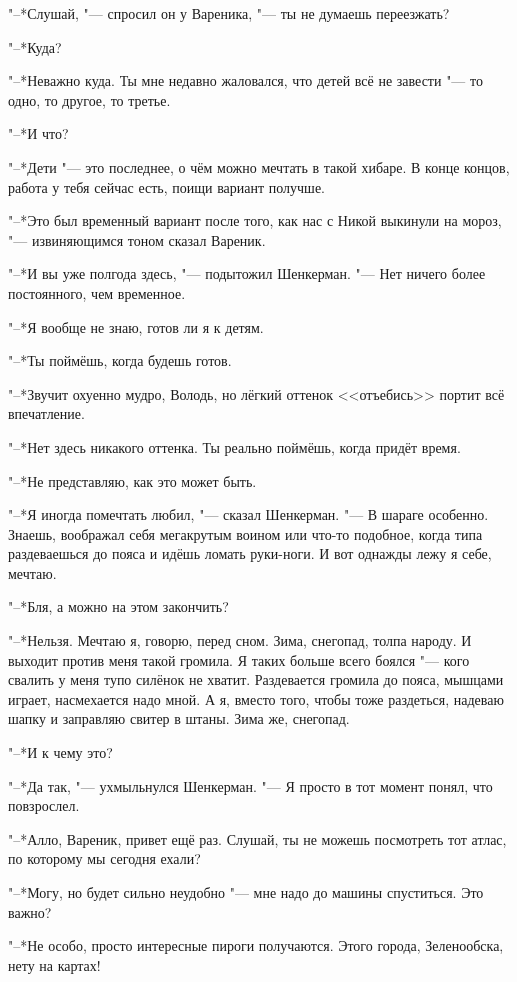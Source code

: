"--*Слушай, "--- спросил он у Вареника, "--- ты не думаешь переезжать?

"--*Куда?

"--*Неважно куда.
Ты мне недавно жаловался, что детей всё не завести "--- то одно, то другое, то третье.

"--*И что?

"--*Дети "--- это последнее, о чём можно мечтать в такой хибаре.
В конце концов, работа у тебя сейчас есть, поищи вариант получше.

"--*Это был временный вариант после того, как нас с Никой выкинули на мороз, "--- извиняющимся тоном сказал Вареник.

"--*И вы уже полгода здесь, "--- подытожил Шенкерман.
"--- Нет ничего более постоянного, чем временное.

"--*Я вообще не знаю, готов ли я к детям.

"--*Ты поймёшь, когда будешь готов.

"--*Звучит охуенно мудро, Володь, но лёгкий оттенок <<отъебись>> портит всё впечатление.

"--*Нет здесь никакого оттенка.
Ты реально поймёшь, когда придёт время.

"--*Не представляю, как это может быть.

"--*Я иногда помечтать любил, "--- сказал Шенкерман.
"--- В шараге особенно.
Знаешь, воображал себя мегакрутым воином или что-то подобное, когда типа раздеваешься до пояса и идёшь ломать руки-ноги.
И вот однажды лежу я себе, мечтаю.

"--*Бля, а можно на этом закончить?

"--*Нельзя.
Мечтаю я, говорю, перед сном.
Зима, снегопад, толпа народу.
И выходит против меня такой громила.
Я таких больше всего боялся "--- кого свалить у меня тупо силёнок не хватит.
Раздевается громила до пояса, мышцами играет, насмехается надо мной.
А я, вместо того, чтобы тоже раздеться, надеваю шапку и заправляю свитер в штаны.
Зима же, снегопад.

"--*И к чему это?

"--*Да так, "--- ухмыльнулся Шенкерман.
"--- Я просто в тот момент понял, что повзрослел.

\asterism

"--*Алло, Вареник, привет ещё раз.
Слушай, ты не можешь посмотреть тот атлас, по которому мы сегодня ехали?

"--*Могу, но будет сильно неудобно "--- мне надо до машины спуститься.
Это важно?

"--*Не особо, просто интересные пироги получаются.
Этого города, Зеленообска, нету на картах!

